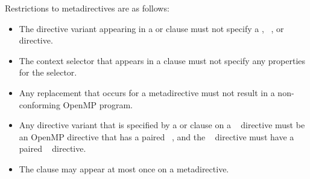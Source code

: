 \restrictions
Restrictions to metadirectives are as follows:

\begin{itemize}
    \item The directive variant appearing in a  or 
        clause must not specify a ,
        ~, or ~
        directive.

    \item The context selector that appears in a  clause must not
        specify any properties for the  selector.

    \item Any replacement that occurs for a metadirective must not result in a
        non-conforming OpenMP program.

    \item Any directive variant that is specified by a  or 
        clause on a ~
        directive must be an OpenMP directive that has a paired ~, and
        the ~ directive must have a paired
        ~ directive.

    \item The  clause may appear at most once on a metadirective.
\end{itemize}
